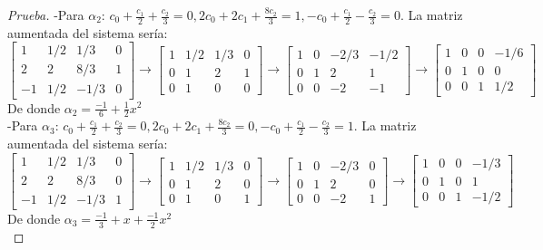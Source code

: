 \documentclass[12pt]{article}
\begin{document}
\begin{proof} [Prueba]
-Para $\alpha_{2}$: $c_{0} + \frac{c_{1}}{2} + \frac{c_{2}}{3}=0,
	2c_{0} + 2c_{1} + \frac{8c_{2}}{3} = 1,
	-c_{0} + \frac{c_{1}}{2} - \frac{c_{2}}{3} = 0
$. La matriz aumentada del sistema sería:\\
$
  \left[\begin{array}{rrr|r}
    1	& 1/2 	& 1/3 	& 0 \\
    2	& 2 	& 8/3 	& 1 \\
    -1	& 1/2 	& -1/3 	& 0 
  \end{array}\right]
  \rightarrow 
  \left[\begin{array}{rrr|r}
    1	& 1/2 	& 1/3 	& 0 \\
    0	& 1 	& 2 	& 1 \\
    0	& 1 	& 0 	& 0 
  \end{array}\right]
  \rightarrow   
  \left[\begin{array}{rrr|r}
    1	& 0 	& -2/3 	& -1/2 \\
    0	& 1 	& 2 	& 1 \\
    0	& 0 	& -2 	& -1 
  \end{array}\right]
  \rightarrow     
  \left[\begin{array}{rrr|r}
    1	& 0 	& 0 	& -1/6 \\
    0	& 1 	& 0 	& 0 \\
    0	& 0 	& 1 	& 1/2 
  \end{array}\right]
$\\
De donde $\alpha_{2} = \frac{-1}{6} + \frac{1}{2}x^{2}$\\

-Para $\alpha_{3}$: $c_{0} + \frac{c_{1}}{2} + \frac{c_{2}}{3}=0,
	2c_{0} + 2c_{1} + \frac{8c_{2}}{3} = 0,
	-c_{0} + \frac{c_{1}}{2} - \frac{c_{2}}{3} = 1
$. La matriz aumentada del sistema sería:\\
$
  \left[\begin{array}{rrr|r}
    1	& 1/2 	& 1/3 	& 0 \\
    2	& 2 	& 8/3 	& 0 \\
    -1	& 1/2 	& -1/3 	& 1 
  \end{array}\right]
  \rightarrow 
  \left[\begin{array}{rrr|r}
    1	& 1/2 	& 1/3 	& 0 \\
    0	& 1 	& 2 	& 0 \\
    0	& 1 	& 0 	& 1 
  \end{array}\right]
  \rightarrow   
  \left[\begin{array}{rrr|r}
    1	& 0 	& -2/3 	& 0 \\
    0	& 1 	& 2 	& 0 \\
    0	& 0 	& -2 	& 1 
  \end{array}\right]
  \rightarrow     
  \left[\begin{array}{rrr|r}
    1	& 0 	& 0 	& -1/3 \\
    0	& 1 	& 0 	& 1 \\
    0	& 0 	& 1 	& -1/2 
  \end{array}\right]
$\\
De donde $\alpha_{3} = \frac{-1}{3} + x + \frac{-1}{2}x^{2}$\\


\end{proof}
\end{document}
